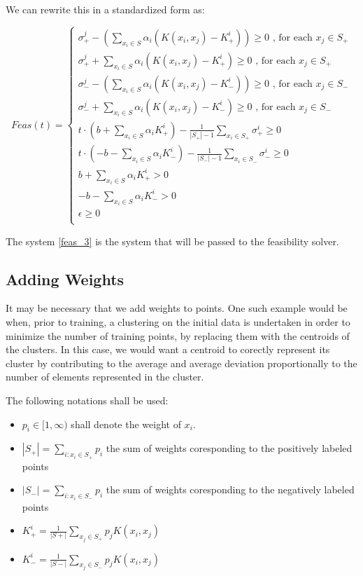 \documentclass[a4paper,twoside,10pt]{report}
\begin{document}
	We can rewrite this in a standardized form as:
	
	\[
		Feas(t) = \left\{
		\begin{array}{l}			
				\sigma^j_+ - (\sum_{x_i\in S} {\alpha_i (K(x_i, x_j) - K^i_+)}) \geq 0 \mbox{ , for each } x_j \in S_+\\
				\sigma^j_+ + \sum_{x_i\in S} {\alpha_i (K(x_i, x_j) - K^i_+)} \geq 0 \mbox{ , for each } x_j \in S_+\\
				
				\sigma^j_- - (\sum_{x_i\in S} {\alpha_i (K(x_i, x_j) - K^i_-)}) \geq 0 \mbox{ , for each } x_j \in S_-\\
				\sigma^j_- + \sum_{x_i\in S} {\alpha_i (K(x_i, x_j) - K^i_-)} \geq 0 \mbox{ , for each } x_j \in S_-\\									
				
				t \cdot (b + \sum_{x_i\in S}{\alpha_i K^i_+}) - \frac{1}{|S_+| - 1} \sum_{x_i\in S_+} {\sigma_+^i} \geq 0\\
				t \cdot (- b - \sum_{x_i\in S}{\alpha_i K^i_-}) - \frac{1}{|S_-| - 1} \sum_{x_i\in S_-} {\sigma_-^i} \geq 0\\
				b + \sum_{x_i\in S}{\alpha_i K^i_+} > 0\\
				- b - \sum_{x_i\in S}{\alpha_i K^i_-} > 0\\
				\epsilon \geq 0\\
		\end{array}
		\right. \label{feas_3}
	\]		
	
	The system \ref{feas_3} is the system that will be passed to the feasibility solver.
	
\subsection{Adding Weights}	
	
	It may be necessary that we add weights to points. One such example would be when, prior to training, a clustering on the initial data 
is undertaken in order to minimize the number of training points, by replacing them with the centroids of the clusters. In this case, we would want 
a centroid to corectly represent its cluster by contributing to the average and average deviation proportionally to the number of elements represented in the cluster.

	The following notations shall be used: 
	
	\begin{itemize}
	 \item \(p_i \in [1, \infty)\) shall denote the weight of \(x_i\). 
	 \item \(|S_+| =\sum_{i : x_i\in S_+}{p_i}\) the sum of weights coresponding to the positively labeled points
	 \item \(|S_-| =\sum_{i : x_i\in S_-}{p_i}\) the sum of weights coresponding to the negatively labeled points
	 \item \(K^i_+ = \frac{1}{|S+|} \sum_{x_j\in S_+}{p_j K(x_i, x_j)}\)
	 \item \(K^i_- = \frac{1}{|S-|} \sum_{x_j\in S_-}{p_j K(x_i, x_j)}\)
	\end{itemize}
	
\end{document}
